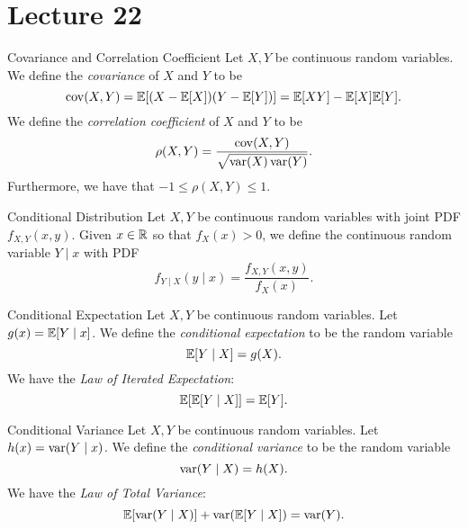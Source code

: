 \documentclass[class=article, crop=false]{standalone}
\begin{document}
  \section{Lecture 22}
  \begin{definition}{Covariance and Correlation Coefficient}
    Let $X, Y$ be continuous random variables. We define the \emph{covariance} of $X$ and $Y$ to be
    \[
      \operatorname{cov}(X, Y) = \mathbb{E}[(X - \mathbb{E}[X])(Y - \mathbb{E}[Y])] = \mathbb{E}[XY] - \mathbb{E}[X]\mathbb{E}[Y].
    \]
    We define the \emph{correlation coefficient} of $X$ and $Y$ to be
    \[
      \rho(X, Y) = \frac{\operatorname{cov}(X, Y)}{\sqrt{\operatorname{var}(X)\operatorname{var}(Y)}}.
    \]
    Furthermore, we have that $-1 \leq \rho(X, Y) \leq 1$.
  \end{definition}
  \begin{definition}{Conditional Distribution}
    Let $X, Y$ be continuous random variables with joint PDF $f_{X, Y}(x, y)$. Given $x\in \mathbb{R}$ so that $f_X(x) > 0$, we define the continuous random variable $Y\mid x$ with PDF
    \[
      f_{Y\mid X}(y\mid x) = \frac{f_{X, Y}(x, y)}{f_X(x)}.
    \]
  \end{definition}
  \begin{definition}{Conditional Expectation}
    Let $X, Y$ be continuous random variables. Let $g(x) = \mathbb{E}[Y\mid x]$. We define the \emph{conditional expectation} to be the random variable
    \[
      \mathbb{E}[Y\mid X] = g(X).
    \]
    We have the \emph{Law of Iterated Expectation}:
    \[
      \mathbb{E}[\mathbb{E}[Y\mid X]] = \mathbb{E}[Y].
    \]
  \end{definition}
  \begin{definition}{Conditional Variance}
    Let $X, Y$ be continuous random variables. Let $h(x) = \operatorname{var}(Y\mid x)$. We define the \emph{conditional variance} to be the random variable
    \[
      \operatorname{var}(Y\mid X) = h(X).
    \]
    We have the \emph{Law of Total Variance}:
    \[
      \mathbb{E}[\operatorname{var}(Y\mid X)] + \operatorname{var}(\mathbb{E}[Y\mid X]) = \operatorname{var}(Y).
    \]
  \end{definition}
\end{document}
